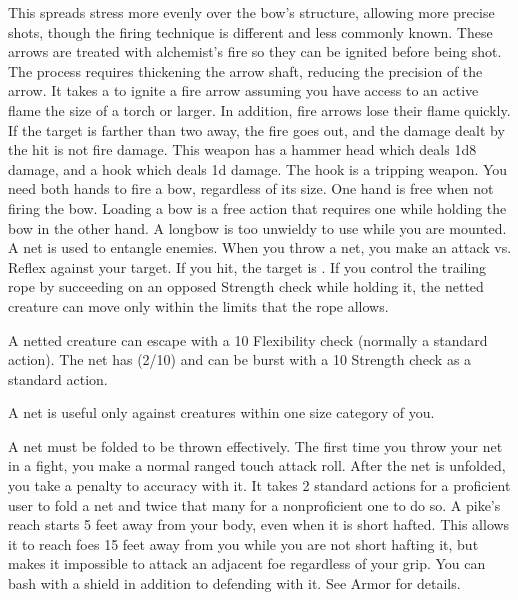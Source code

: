        This spreads stress more evenly over the bow's structure, allowing more precise shots, though the firing technique is different and less commonly known.
         These arrows are treated with alchemist's fire so they can be ignited before being shot.
        The process requires thickening the arrow shaft, reducing the precision of the arrow.
        It takes a  to ignite a fire arrow assuming you have access to an active flame the size of a torch or larger.
        In addition, fire arrows lose their flame quickly.
        If the target is farther than two  away, the fire goes out, and the damage dealt by the hit is not fire damage.
         This weapon has a hammer head which deals 1d8 damage, and a hook which deals \minus1d damage. The hook is a tripping weapon.
         You need both hands to fire a bow, regardless of its size. One hand is free when not firing the bow. Loading a bow is a free action that requires one  while holding the bow in the other hand. A longbow is too unwieldy to use while you are mounted.
         A net is used to entangle enemies. When you throw a net, you make an attack vs. Reflex against your target. If you hit, the target is \slowed. If you control the trailing rope by succeeding on an opposed Strength check while holding it, the netted creature can move only within the limits that the rope allows.
        \par A netted creature can escape with a  10 Flexibility check (normally a standard action). The net has (2/10) and can be burst with a  10 Strength check as a standard action.
        \par A net is useful only against creatures within one size category of you.
        \par A net must be folded to be thrown effectively. The first time you throw your net in a fight, you make a normal ranged touch attack roll. After the net is unfolded, you take a  penalty to accuracy with it. It takes 2 standard actions for a proficient user to fold a net and twice that many for a nonproficient one to do so.
         A pike's reach starts 5 feet away from your body, even when it is short hafted.
        This allows it to reach foes 15 feet away from you while you are not short hafting it, but makes it impossible to attack an adjacent foe regardless of your grip.
         You can bash with a shield in addition to defending with it. See Armor for details.
